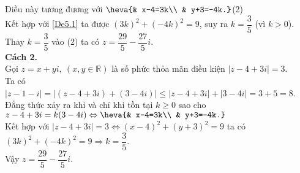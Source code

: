 \begin{ex}
{		Điều này tương đương với $ \heva{& x-4=3k\\ & y+3=-4k.} $\hfill (2)\\
		Kết hợp với \eqref{De5.1} ta được $ (3k)^2+(-4k)^2=9$, suy ra $k=\dfrac{3}{5}$ (vì $ k>0 $).\\
		Thay $k=\dfrac{3}{5} $ vào (2) ta có $ z=\dfrac{29}{5}-\dfrac{27}{5}i$.\\
		{\bf Cách 2.}\\
		Gọi $ z=x+yi,\ (x, y\in\mathbb{R}) $ là số phức thỏa mãn điều kiện $ |z-4+3i|=3 $.\\
		Ta có $|z-1-i|=|(z-4+3i)+(3-4i)|\leq |z-4+3i|+|3-4i|=3+5=8 $.\\
		Đẳng thức xảy ra khi và chỉ khi tồn tại $ k\geq 0 $ sao cho $ z-4+3i=k(3-4i)\Leftrightarrow\heva{& x-4=3k\\ & y+3=-4k.} $\\
		Kết hợp với $ |z-4+3i|=3\Leftrightarrow (x-4)^2+(y+3)^2=9 $ ta có $ \left(3k\right)^2+\left(-4k\right)^2=9\Rightarrow k=\dfrac{3}{5} $.\\
		Vậy $ z=\dfrac{29}{5}-\dfrac{27}{5} i $.		
	}
\end{ex}

